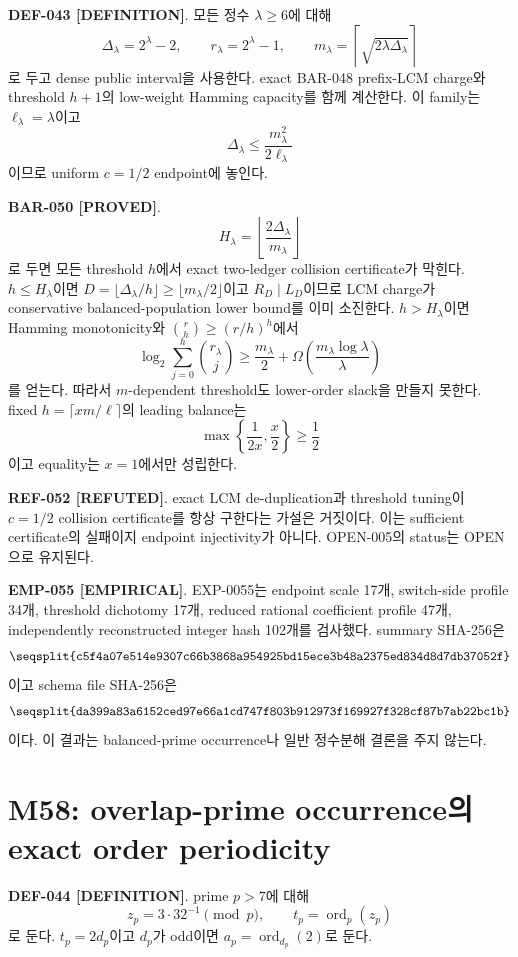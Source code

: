 \documentclass[11pt]{article}
\newcommand{\claimstatus}[2]{\textbf{#1 [#2]}}
\begin{document}
\claimstatus{DEF-043}{DEFINITION}.
모든 정수 \(\lambda\ge6\)에 대해
\[
\Delta_\lambda=2^\lambda-2,\qquad
r_\lambda=2^\lambda-1,\qquad
m_\lambda=\left\lceil\sqrt{2\lambda\Delta_\lambda}\right\rceil
\tag{M57.1}
\]
로 두고 dense public interval을 사용한다. exact BAR-048 prefix-LCM
charge와 threshold \(h+1\)의 low-weight Hamming capacity를 함께
계산한다. 이 family는 \(\ell_\lambda=\lambda\)이고
\[
\Delta_\lambda\le\frac{m_\lambda^2}{2\ell_\lambda}
\tag{M57.2}
\]
이므로 uniform \(c=1/2\) endpoint에 놓인다.

\claimstatus{BAR-050}{PROVED}.
\[
H_\lambda=
\left\lfloor\frac{2\Delta_\lambda}{m_\lambda}\right\rfloor
\tag{M57.3}
\]
로 두면 모든 threshold \(h\)에서 exact two-ledger collision
certificate가 막힌다. \(h\le H_\lambda\)이면
\(D=\lfloor\Delta_\lambda/h\rfloor\ge\lfloor m_\lambda/2\rfloor\)이고
\(R_D\mid L_D\)이므로 LCM charge가 conservative balanced-population
lower bound를 이미 소진한다. \(h>H_\lambda\)이면 Hamming
monotonicity와 \(\binom rh\ge(r/h)^h\)에서
\[
\log_2\sum_{j=0}^{h}\binom{r_\lambda}{j}
\ge
\frac{m_\lambda}{2}
+\Omega\left(
\frac{m_\lambda\log\lambda}{\lambda}
\right)
\tag{M57.4}
\]
를 얻는다. 따라서 \(m\)-dependent threshold도 lower-order slack을
만들지 못한다. fixed \(h=\lceil xm/\ell\rceil\)의 leading balance는
\[
\max\left\{\frac{1}{2x},\frac{x}{2}\right\}\ge\frac12
\tag{M57.5}
\]
이고 equality는 \(x=1\)에서만 성립한다.

\claimstatus{REF-052}{REFUTED}.
exact LCM de-duplication과 threshold tuning이 \(c=1/2\) collision
certificate를 항상 구한다는 가설은 거짓이다. 이는 sufficient
certificate의 실패이지 endpoint injectivity가 아니다.
OPEN-005의 status는 OPEN으로 유지된다.

\claimstatus{EMP-055}{EMPIRICAL}.
EXP-0055는 endpoint scale 17개, switch-side profile 34개, threshold
dichotomy 17개, reduced rational coefficient profile 47개, independently
reconstructed integer hash 102개를 검사했다. summary SHA-256은
\[
\texttt{\seqsplit{c5f4a07e514e9307c66b3868a954925bd15ece3b48a2375ed834d8d7db37052f}}
\]
이고 schema file SHA-256은
\[
\texttt{\seqsplit{da399a83a6152ced97e66a1cd747f803b912973f169927f328cf87b7ab22bc1b}}
\]
이다. 이 결과는 balanced-prime occurrence나 일반 정수분해 결론을
주지 않는다.

\section{M58: overlap-prime occurrence의 exact order periodicity}

\claimstatus{DEF-044}{DEFINITION}.
prime \(p>7\)에 대해
\[
z_p=3\cdot32^{-1}\pmod p,\qquad
t_p=\operatorname{ord}_p(z_p)
\tag{M58.1}
\]
로 둔다. \(t_p=2d_p\)이고 \(d_p\)가 odd이면
\(a_p=\operatorname{ord}_{d_p}(2)\)로 둔다.
\end{document}
